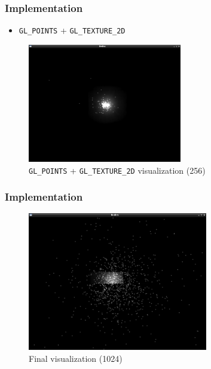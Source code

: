 \begin{frame}
    \frametitle{Implementation}
    \begin{itemize}
        \item \texttt{GL\_POINTS} + \texttt{GL\_TEXTURE\_2D}
    \end{itemize}
    \begin{figure}
        \begin{center}
           \includegraphics[width=0.6\textwidth]{img/bodies_con_textura} 
        \end{center}
        \caption{\texttt{GL\_POINTS} + \texttt{GL\_TEXTURE\_2D} visualization (256)}
    \end{figure}
\end{frame}

\begin{frame}
    \frametitle{Implementation}
    \begin{figure}
        \begin{center}
           \includegraphics[width=0.7\textwidth]{img/bodies_con_textura_1024-2} 
        \end{center}
        \caption{Final visualization (1024)}
    \end{figure}
\end{frame}

